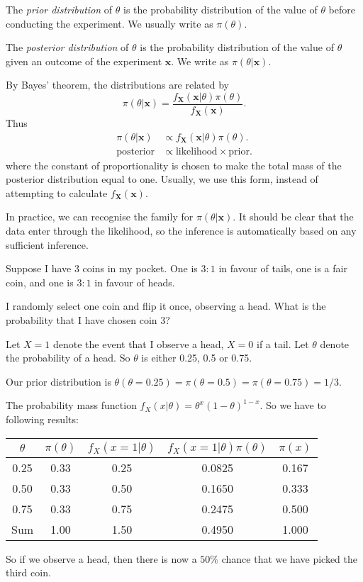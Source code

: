 \documentclass[a4paper]{article}
\begin{document}
\begin{defi}
  The \emph{prior distribution} of $\theta$ is the probability distribution of the value of $\theta$ before conducting the experiment. We usually write as $\pi(\theta)$.

  The \emph{posterior distribution} of $\theta$ is the probability distribution of the value of $\theta$ given an outcome of the experiment $\mathbf{x}$. We write as $\pi(\theta|\mathbf{x})$.
\end{defi}
By Bayes' theorem, the distributions are related by
\[
  \pi(\theta|\mathbf{x}) = \frac{f_{\mathbf{X}}(\mathbf{x}|\theta)\pi(\theta)}{f_{\mathbf{X}}(\mathbf{x})}.
\]
Thus
\begin{align*}
  \pi(\theta|\mathbf{x}) &\propto f_{\mathbf{X}}(\mathbf{x}|\theta)\pi(\theta).\\
  \text{posterior} &\propto \text{likelihood}\times\text{prior}.
\end{align*}
where the constant of proportionality is chosen to make the total mass of the posterior distribution equal to one. Usually, we use this form, instead of attempting to calculate $f_\mathbf{X}(\mathbf{x})$.

In practice, we can recognise the family for $\pi(\theta|\mathbf{x})$. It should be clear that the data enter through the likelihood, so the inference is automatically based on any sufficient inference.

\begin{eg}
  Suppose I have $3$ coins in my pocket. One is $3:1$ in favour of tails, one is a fair coin, and one is $3:1$ in favour of heads.

  I randomly select one coin and flip it once, observing a head. What is the probability that I have chosen coin 3?

  Let $X = 1$ denote the event that I observe a head, $X = 0$ if a tail. Let $\theta$ denote the probability of a head. So $\theta$ is either 0.25, 0.5 or 0.75.

  Our prior distribution is $\theta(\theta = 0.25) = \pi(\theta = 0.5) = \pi(\theta = 0.75) = 1/3$.

  The probability mass function $f_X(x|\theta) = \theta^x(1 - \theta)^{1 - x}$. So we have to following results:

  \begin{tabular}{ccccc}
    \toprule
    $\theta$ & $\pi(\theta)$ & $f_X(x = 1|\theta)$ & $f_X(x = 1|\theta)\pi(\theta)$ & $\pi(x)$\\
    \midrule
    0.25 & 0.33 & 0.25 & 0.0825 & 0.167\\
    0.50 & 0.33 & 0.50 & 0.1650 & 0.333\\
    0.75 & 0.33 & 0.75 & 0.2475 & 0.500\\
    \midrule
    Sum & 1.00 & 1.50 & 0.4950 & 1.000\\
    \bottomrule
  \end{tabular}

  So if we observe a head, then there is now a $50\%$ chance that we have picked the third coin.
\end{eg}
\end{document}

